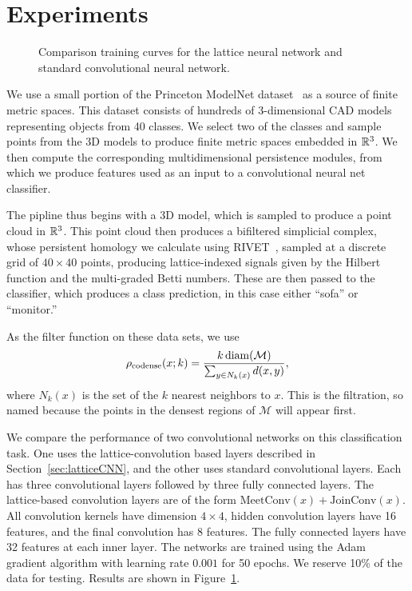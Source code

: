 \documentclass{article}
\begin{document}
\section{Experiments}
\begin{figure}
  \caption{Comparison training curves for the lattice neural network and
    standard convolutional neural network.}\label{fig:comparison}
\end{figure}

We use a small portion of the Princeton ModelNet
dataset~\cite{zhirong_wu_3d_2015} as a source of finite
metric spaces. This dataset consists of hundreds of 3-dimensional CAD models
representing objects from 40 classes. We select two of the classes and sample
points from the 3D models to produce finite metric spaces embedded in $\mathbb{R}^3$.
We then compute the corresponding multidimensional persistence modules, from
which we produce features used as an input to a convolutional neural net
classifier.

The pipline thus begins with a 3D model, which is sampled to produce a point
cloud in $\mathbb{R}^3$. This point cloud then produces a bifiltered simplicial complex,
whose persistent homology we calculate using
RIVET~\cite{lesnick_interactive_2015}, sampled at a discrete grid of $40 \times
40$ points, producing lattice-indexed signals given by the Hilbert function and
the multi-graded Betti numbers. These are then passed to the classifier, which
produces a class prediction, in this case either ``sofa'' or ``monitor.''

As the filter function on these data sets, we use
\[\rho_{\text{codense}}(x;k) = \frac{k \operatorname{diam}(\mathcal M)}{\sum_{y \in N_k(x)}
    d(x,y)},\]
where $N_k(x)$ is the set of the $k$ nearest neighbors to $x$. This is the
 filtration, so named because the points in the densest
regions of $\mathcal M$ will appear first.


We compare the performance of two convolutional networks on this classification
task. One uses the lattice-convolution based layers described in
Section~\ref{sec:latticeCNN}, and the other uses standard convolutional layers.
Each has three convolutional layers followed by three fully connected layers.
The lattice-based convolution layers are of the form $\text{MeetConv}(x) +
\text{JoinConv}(x)$. All convolution kernels have dimension $4 \times 4$, hidden
convolution layers have 16 features, and the final convolution has 8 features.
The fully connected layers have 32 features at each inner layer.
The networks are trained using the Adam gradient algorithm with learning rate
$0.001$ for 50 epochs. We reserve 10\% of the data for testing. Results are
shown in Figure~\ref{fig:comparison}.
\end{document}
